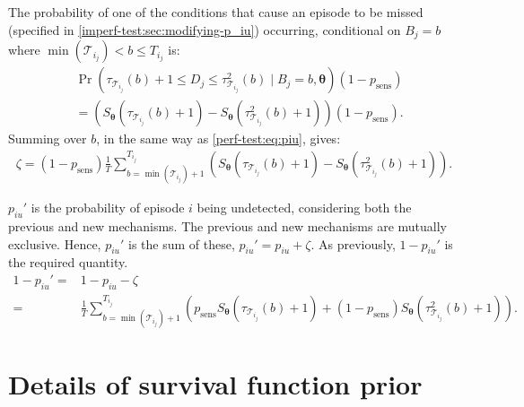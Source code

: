 \documentclass[referee,useAMS,usenatbib]{biom}
\DeclareMathOperator{\prob}{\mathrm{Pr}}
\renewcommand{\vec}[1]{\bm{#1}}
\newcommand{\psens}{p_\text{sens}}
\newcommand{\sched}{\mathcal{T}}
\begin{document}
The probability of one of the conditions that cause an episode to be missed (specified in \cref{imperf-test:sec:modifying-p_iu}) occurring, conditional on $B_j = b$ where $\min(\sched_{i_j}) < b \leq T_{i_j}$ is:
\begin{align}
&\prob \left(
    \tau_{\sched_{i_j}}(b) + 1 \leq D_j \leq \tau^2_{\sched_{i_j}}(b)
    \mid B_j = b, \vec{\theta} \right) (1 - \psens) \\
&= \left( S_{\vec{\theta}}(\tau_{\sched_{i_j}}(b) + 1) - S_{\vec{\theta}}(\tau^2_{\sched_{i_j}}(b) + 1) \right) (1 - \psens).
\end{align}
Summing over $b$, in the same way as \cref{perf-test:eq:piu}, gives:
\begin{align}
\zeta = (1 - p_\text{sens})\frac{1}{T} \sum_{b=\min(\sched_{i_j}) + 1}^{T_{i_j}} \left( S_{\vec{\theta}}(\tau_{\sched_{i_j}}(b) + 1) - S_{\vec{\theta}}(\tau^2_{\sched_{i_j}}(b) + 1) \right).
\label{imperf-test:eq:zeta}
\end{align}

$p_{iu}'$ is the probability of episode $i$ being undetected, considering both the previous and new mechanisms.
The previous and new mechanisms are mutually exclusive.
Hence, $p_{iu}'$ is the sum of these, $p_{iu}' = p_{iu} + \zeta$.
As previously, $1 - p_{iu}'$ is the required quantity.
\begin{align}
1 - p_{iu}'
=& 1 - p_{iu} - \zeta \\
=& \frac{1}{T} \sum_{b=\min(\sched_{i_j}) + 1}^{T_{i_j}} \left( p_\text{sens} S_{\vec{\theta}}(\tau_{\sched_{i_j}}(b) + 1) + (1 - p_\text{sens}) S_{\vec{\theta}}(\tau^2_{\sched_{i_j}}(b) + 1)\right).
\end{align}

\section{Details of survival function prior} \label{sec:details-priors}
\end{document}
